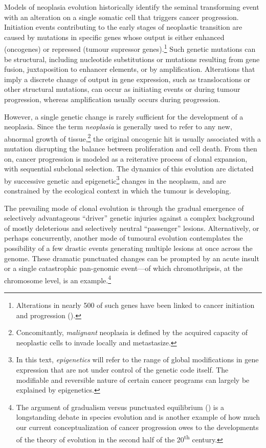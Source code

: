 Models of neoplasia evolution historically identify the seminal transforming
event with an alteration on a single somatic cell that triggers cancer
progression.  Initiation events contributing to the early stages of neoplastic
transition are caused by mutations in specific genes whose output is either
enhanced (oncogenes) or repressed (tumour supressor genes).\footnote{Alterations
  in nearly 500 of such genes have been linked to cancer initiation and
  progression (\citealp{forbes_catalogue_2008}).}  Such genetic mutations can be
structural, including nucleotide substitutions or mutations resulting from gene
fusion,\cite{konopka_cell_1985} juxtaposition to enhancer
elements,\cite{tsujimoto_t14;18_1985} or by amplification.  Alterations that
imply a discrete change of output in gene expression, such as translocations or
other structural mutations, can occur as initiating
events\cite{finger_common_1986} or during tumour progression, whereas
amplification usually occurs during progression.\cite{croce_oncogenes_2008}

However, a single genetic change is rarely sufficient for the development of a
neoplasia.  Since the term \emph{neoplasia} is generally used to refer to any
new, abnormal growth of tissue,\footnote{Concomitantly, \emph{malignant}
  neoplasia is defined by the acquired capacity of neoplastic cells to invade
  locally and metastasize.} the original oncogenic hit is usually associated
with a mutation disrupting the balance between proliferation and cell death.
From then on, cancer progression is modeled as a reiterative process of clonal
expansion, with sequential subclonal
selection.\cite{nowell_clonal_1976,greaves_clonal_2012} The dynamics of this
evolution are dictated by successive genetic and epigenetic\footnote{In this
  text, \emph{epigenetics} will refer to the range of global modifications in
  gene expression that are not under control of the genetic code itself.  The
  modifiable and reversible nature of certain cancer programs can largely be
  explained by epigenetics.} changes in the neoplasm, and are constrained by the
ecological context in which the tumour is developing.

The prevailing mode of clonal evolution is through the gradual emergence of
selectively advantageous ``driver'' genetic injuries against a complex
background of mostly deleterious and selectively neutral ``passenger'' lesions.
Alternatively, or perhaps concurrently, another mode of tumoural evolution
contemplates the possibility of a few drastic events generating multiple lesions
at once across the genome.  These dramatic punctuated changes can be prompted by
an acute insult or a single catastrophic pan-genomic event---of which
chromothripsis, at the chromosome level, is an
example.\cite{stephens_massive_2011}\footnote{The argument of gradualism versus
  punctuated equilibrium (\citealp{gould_punctuated_1993}) is a longstanding
  debate in species evolution and is another example of how much our current
  conceptualization of cancer progression owes to the developments of the theory
  of evolution in the second half of the 20\textsuperscript{th} century.}

